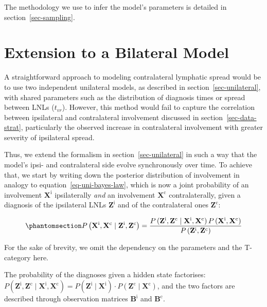 \documentclass[
  sn-mathphys-num,
]{sn-jnl}
\begin{document}
The methodology we use to infer the model's parameters is detailed in
section~\ref{sec-sampling}.

\section{Extension to a Bilateral Model}\label{sec-ext-to-contra}

A straightforward approach to modeling contralateral lymphatic spread
would be to use two independent unilateral models, as described in
section~\ref{sec-unilateral}, with shared parameters such as the
distribution of diagnosis times or spread between LNLs (\(t_{vr}\)).
However, this method would fail to capture the correlation between
ipsilateral and contralateral involvement discussed in
section~\ref{sec-data-strat}, particularly the observed increase in
contralateral involvement with greater severity of ipsilateral spread.

Thus, we extend the formalism in section~\ref{sec-unilateral} in such a
way that the model's ipsi- and contralateral side evolve synchronously
over time. To achieve that, we start by writing down the posterior
distribution of involvement in analogy to
equation~\ref{eq-uni-bayes-law}, which is now a joint probability of an
involvement \(\mathbf{X}^\text{i}\) ipsilaterally \emph{and} an
involvement \(\mathbf{X}^\text{c}\) contralaterally, given a diagnosis
of the ipsilateral LNLs \(\mathbf{Z}^\text{i}\) and of the contralateral
ones \(\mathbf{Z}^\text{c}\):

\begin{equation}\phantomsection\label{eq-bilateral-bayes}{
P \left( \mathbf{X}^\text{i}, \mathbf{X}^\text{c} \mid \mathbf{Z}^\text{i}, \mathbf{Z}^\text{c} \right) = \frac{P \left( \mathbf{Z}^\text{i}, \mathbf{Z}^\text{c} \mid \mathbf{X}^\text{i}, \mathbf{X}^\text{c} \right) P \left( \mathbf{X}^\text{i}, \mathbf{X}^\text{c} \right)}{P \left( \mathbf{Z}^\text{i}, \mathbf{Z}^\text{c} \right)}
}\end{equation}

For the sake of brevity, we omit the dependency on the parameters and
the T-category here.

The probability of the diagnoses given a hidden state factorises:
\(P \left( \mathbf{Z}^\text{i}, \mathbf{Z}^\text{c} \mid \mathbf{X}^\text{i}, \mathbf{X}^\text{c} \right) = P \left( \mathbf{Z}^\text{i} \mid \mathbf{X}^\text{i} \right) \cdot P \left( \mathbf{Z}^\text{c} \mid \mathbf{X}^\text{c} \right)\),
and the two factors are described through observation matrices
\(\mathbf{B}^\text{i}\) and \(\mathbf{B}^\text{c}\).
\end{document}
